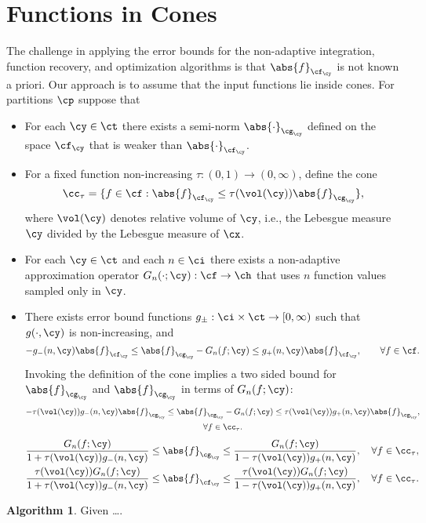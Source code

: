 \documentclass[final]{elsarticle}
\newcommand{\FYnorm}[1]{\abs{#1}_{\cf_{\cy}}}
\newcommand{\GYnorm}[1]{\abs{#1}_{\cg_{\cy}}}
\theoremstyle{definition}
\newtheorem{algo}{Algorithm}
\theoremstyle{remark}
\begin{document}
\section{Functions in Cones} 
The challenge in applying the error bounds for the non-adaptive integration, function recovery, and optimization algorithms is that $\FYnorm{f}$ is not known a priori.  Our approach is to assume that the input functions lie inside cones. For partitions $\cp$ suppose that 
\begin{itemize}

\item For each $\cy \in \ct$ there exists a semi-norm $\GYnorm{\cdot}$ defined on the space $\cf_{\cy}$ that is weaker than $\FYnorm{\cdot}$.

\item For a fixed function non-increasing $\tau: (0,1) \to (0,\infty)$, define the cone 
\begin{equation} \label{defcone}
\cc_{\tau} = \{ f \in \cf : \FYnorm{f} \le \tau(\vol(\cy)) \GYnorm{f} \},
\end{equation}
where $\vol(\cy)$ denotes relative volume of $\cy$, i.e., the Lebesgue measure $\cy$ divided by the Lebesgue measure of $\cx$.

\item For each $\cy \in \ct$ and each $n \in \ci$ there exists a non-adaptive approximation operator $G_n(\cdot;\cy) : \cf \to \ch$ that uses $n$ function values sampled only in $\cy$.

\item There exists error bound functions $g_{\pm}:\ci \times \ct \to [0,\infty)$ such that $g(\cdot,\cy)$ is non-increasing, and
\[
-g_{-}(n,\cy) \FYnorm{f} \le \GYnorm{f} - G_n(f;\cy) \le g_{+}(n,\cy) \FYnorm{f}, \qquad \forall f \in \cf.
\]
Invoking the definition of the cone implies a two sided bound for  $\GYnorm{f}$ and $\GYnorm{f}$ in terms of $G_n(f;\cy)$:
\begin{multline*}
-\tau(\vol(\cy)) g_{-}(n,\cy) \GYnorm{f} \le \GYnorm{f} - G_n(f;\cy) \le \tau(\vol(\cy)) g_{+}(n,\cy) \GYnorm{f}, \\ \forall f \in \cc_{\tau}.
\end{multline*}
\begin{gather*}
\frac{G_n(f;\cy)}{1+\tau(\vol(\cy)) g_{-}(n,\cy)} \le \GYnorm{f} \le \frac{G_n(f;\cy)}{1-\tau(\vol(\cy)) g_{+}(n,\cy)}, \quad \forall f \in \cc_{\tau}, \\
\frac{\tau(\vol(\cy))G_n(f;\cy)}{1+\tau(\vol(\cy)) g_{-}(n,\cy)} \le \FYnorm{f} \le \frac{\tau(\vol(\cy))G_n(f;\cy)}{1-\tau(\vol(\cy)) g_{+}(n,\cy)}, \quad \forall f \in \cc_{\tau}.
\end{gather*}

\end{itemize}


\begin{algo} Given \ldots.  


\end{algo}




\end{document}
